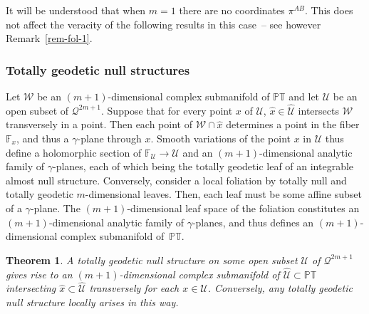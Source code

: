\documentclass[pdftex]{sigma}
\numberwithin{equation}{section}
\newtheorem{Theorem}{Theorem}[section]
\newcommand{\mc} [1]{\mathcal{#1}}
\newcommand{\PT} {\mathbb{PT}}
\newcommand{\F} {\mathbb{F}}
\begin{document}
\begin{Remark}It will be understood that when $m=1$ there are no coordinates $\pi^{AB}$. This does not af\/fect the veracity of the following results in this case~-- see however Remark~\ref{rem-fol-1}.
\end{Remark}

\subsubsection{Totally geodetic null structures}
Let $\mc{W}$ be an $(m+1)$-dimensional complex submanifold of $\PT$ and let $\mc{U}$ be an open subset of $\mc{Q}^{2m+1}$. Suppose that for every point $x$ of $\mc{U}$, $\hat{x} \in \widehat{\mc{U}}$ intersects $\mc{W}$ transversely in a point. Then each point of $\mc{W} \cap \hat{x}$ determines a point in the f\/iber $\F_x$, and thus a $\gamma$-plane through $x$. Smooth variations of the point $x$ in $\mc{U}$ thus def\/ine a holomorphic section of $\F_\mc{U} \rightarrow \mc{U}$ and an $(m+1)$-dimensional analytic family of $\gamma$-planes, each of which being the totally geodetic leaf of an integrable almost null structure. Conversely, consider a local foliation by totally null and totally geodetic $m$-dimensional leaves. Then, each leaf must be some af\/f\/ine subset of a $\gamma$-plane. The $(m+1)$-dimensional leaf space of the foliation constitutes an $(m+1)$-dimensional analytic family of $\gamma$-planes, and thus def\/ines an $(m+1)$-dimensional complex submanifold of~$\PT$.

\begin{Theorem}\label{thm-odd-Kerr-theorem-I}
A totally geodetic null structure on some open subset $\mc{U}$ of $\mc{Q}^{2m+1}$ gives rise to an $(m+1)$-dimensional complex submanifold of $\widehat{\mc{U}} \subset \PT$ intersecting $\hat{x} \subset \widehat{\mc{U}}$ transversely for each $x \in \mc{U}$. Conversely, any totally geodetic null structure locally arises in this way.
\end{Theorem}
\end{document}
